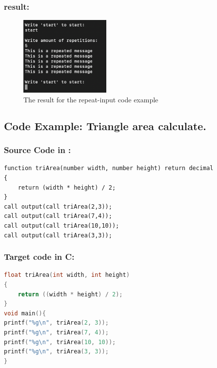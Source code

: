 \subsubsection{result:}
\begin{figure}[H] 
    \begin{center}
        \includegraphics[width=0.40\textwidth]{Files/Billeder: Appendix/Repat And Input.png}
    \end{center}
    \caption{The result for the repeat-input code example}
    \label{figure:repeatinput_result}
\end{figure}




\subsection{Code Example: Triangle area calculate.}

\subsubsection{Source Code in \lang:}
\begin{lstlisting}[language = scriptkid, firstnumber=1, label={list:acceptance_test_triangle}, caption=Acceptance test calculating triangle code examples]
function triArea(number width, number height) return decimal
{ 
    return (width * height) / 2; 
} 
call output(call triArea(2,3)); 
call output(call triArea(7,4)); 
call output(call triArea(10,10)); 
call output(call triArea(3,3)); 
\end{lstlisting}



\subsubsection{Target code in C:}
\begin{lstlisting}[language = C, firstnumber=1, label={list:acceptance_test_triangle_output}, caption=Acceptance test triangle code examples in C]
float triArea(int width, int height)
{
    return ((width * height) / 2);
}
void main(){
printf("%g\n", triArea(2, 3));
printf("%g\n", triArea(7, 4));
printf("%g\n", triArea(10, 10));
printf("%g\n", triArea(3, 3));
}
\end{lstlisting}

